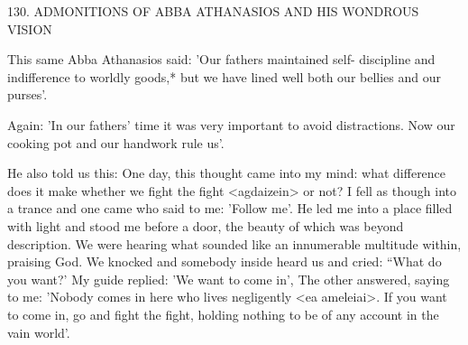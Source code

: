 130. ADMONITIONS OF ABBA ATHANASIOS
AND HIS WONDROUS VISION

This same Abba Athanasios said: 'Our fathers maintained self-
discipline and indifference to worldly goods,* but we have lined well
both our bellies and our purses'.

Again: 'In our fathers' time it was very important to avoid
distractions. Now our cooking pot and our handwork rule us'.

He also told us this:
One day, this thought came into my mind: what difference does it
make whether we fight the fight <agdaizein> or not? I fell as
though into a trance and one came who said to me: 'Follow me'. He
led me into a place filled with light and stood me before a door, the
beauty of which was beyond description. We were hearing what
sounded like an innumerable multitude within, praising God. We
knocked and somebody inside heard us and cried: “What do you
want?' My guide replied: 'We want to come in', The other answered,
saying to me: 'Nobody comes in here who lives negligently <ea
ameleiai>. If you want to come in, go and fight the fight, holding
nothing to be of any account in the vain world'.

